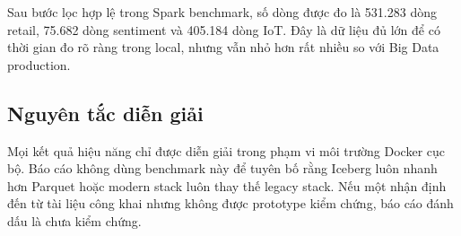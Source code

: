 Sau bước lọc hợp lệ trong Spark benchmark, số dòng được đo là 531.283 dòng retail, 75.682 dòng sentiment và 405.184 dòng IoT. Đây là dữ liệu đủ lớn để có thời gian đo rõ ràng trong local, nhưng vẫn nhỏ hơn rất nhiều so với Big Data production.

\subsection{Nguyên tắc diễn giải}

Mọi kết quả hiệu năng chỉ được diễn giải trong phạm vi môi trường Docker cục bộ. Báo cáo không dùng benchmark này để tuyên bố rằng Iceberg luôn nhanh hơn Parquet hoặc modern stack luôn thay thế legacy stack. Nếu một nhận định đến từ tài liệu công khai nhưng không được prototype kiểm chứng, báo cáo đánh dấu là chưa kiểm chứng.
